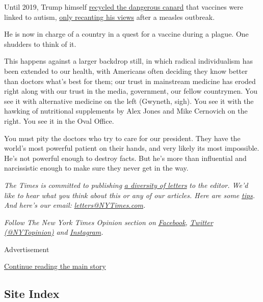 Until 2019, Trump himself
\href{https://twitter.com/realDonaldTrump/status/449525268529815552}{recycled
the dangerous canard} that vaccines were linked to autism,
\href{https://www.statnews.com/2019/04/26/trump-vaccinations-measles/}{only
recanting his views} after a measles outbreak.

He is now in charge of a country in a quest for a vaccine during a
plague. One shudders to think of it.

This happens against a larger backdrop still, in which radical
individualism has been extended to our health, with Americans often
deciding they know better than doctors what's best for them; our trust
in mainstream medicine has eroded right along with our trust in the
media, government, our fellow countrymen. You see it with alternative
medicine on the left (Gwyneth, sigh). You see it with the hawking of
nutritional supplements by Alex Jones and Mike Cernovich on the right.
You see it in the Oval Office.

You must pity the doctors who try to care for our president. They have
the world's most powerful patient on their hands, and very likely its
most impossible. He's not powerful enough to destroy facts. But he's
more than influential and narcissistic enough to make sure they never
get in the way.

\emph{The Times is committed to publishing}
\href{https://www.nytimes3xbfgragh.onion/2019/01/31/opinion/letters/letters-to-editor-new-york-times-women.html}{\emph{a
diversity of letters}} \emph{to the editor. We'd like to hear what you
think about this or any of our articles. Here are some}
\href{https://help.nytimes3xbfgragh.onion/hc/en-us/articles/115014925288-How-to-submit-a-letter-to-the-editor}{\emph{tips}}\emph{.
And here's our email:}
\href{mailto:letters@NYTimes.com}{\emph{letters@NYTimes.com}}\emph{.}

\emph{Follow The New York Times Opinion section on}
\href{https://www.facebookcorewwwi.onion/nytopinion}{\emph{Facebook}}\emph{,}
\href{http://twitter.com/NYTOpinion}{\emph{Twitter (@NYTopinion)}}
\emph{and}
\href{https://www.instagram.com/nytopinion/}{\emph{Instagram}}\emph{.}

Advertisement

\protect\hyperlink{after-bottom}{Continue reading the main story}

\hypertarget{site-index}{%
\subsection{Site Index}\label{site-index}}

